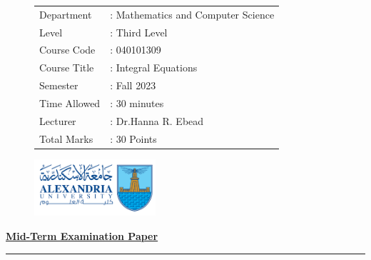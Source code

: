 \documentclass[]{article}
\begin{document}
\thispagestyle{empty}
\begin{figure}
    \begin{minipage}{0.7\textwidth}
        \begin{tabular}{l l}
            Department   & : Mathematics and Computer Science \\
            Level        & : Third Level                      \\
            Course Code  & : 040101309                        \\
            Course Title & : Integral Equations               \\
            Semester     & : Fall 2023                        \\
            Time Allowed & : 30 minutes                       \\
            Lecturer     & : Dr.Hanna R. Ebead                \\
            Total Marks  & : 30 Points                        \\
        \end{tabular}
    \end{minipage}%
    \begin{minipage}{0.3\textwidth}
        \includegraphics[width=4.5cm]{collagelogo.png}
    \end{minipage}
\end{figure}
\vspace*{-1cm}
\begin{center}
    \textbf{\underline{\LARGE Mid-Term Examination Paper}}
\end{center}
\vspace*{.2cm}

\hrule
\end{document}
